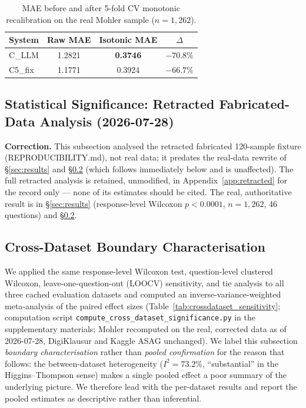 \documentclass[conference]{IEEEtran}
\begin{document}
\begin{table}[t]
\caption{MAE before and after 5-fold CV monotonic recalibration on the
real Mohler sample ($n=1{,}262$).}
\label{tab:calibration}
\centering
\begin{tabular}{lccc}
\toprule
\textbf{System} & \textbf{Raw MAE} & \textbf{Isotonic MAE} & \textbf{$\Delta$} \\
\midrule
C\_LLM  & 1.2821 & \textbf{0.3746} & $-70.8\%$ \\
C5\_fix & 1.1771 & 0.3924 & $-66.7\%$ \\
\bottomrule
\end{tabular}
\end{table}

\subsection{Statistical Significance: Retracted Fabricated-Data Analysis (2026-07-28)}
\label{subsec:significance}

\textbf{Correction.} This subsection analysed the retracted fabricated
120-sample fixture (REPRODUCIBILITY.md), not real data; it predates the
real-data rewrite of \S\ref{sec:results} and
\S\ref{subsec:crossdataset_sig} (which follows immediately below and is
unaffected). The full retracted analysis is retained, unmodified, in
Appendix~\ref{app:retracted} for the record only --- none of its
estimates should be cited. The real, authoritative result is in
\S\ref{sec:results} (response-level Wilcoxon $p<0.0001$, $n=1{,}262$,
46 questions) and \S\ref{subsec:crossdataset_sig}.


\subsection{Cross-Dataset Boundary Characterisation}
\label{subsec:crossdataset_sig}

We applied the same response-level Wilcoxon test, question-level clustered
Wilcoxon, leave-one-question-out (LOOCV) sensitivity, and tie analysis to all
three cached evaluation datasets and computed an inverse-variance-weighted
meta-analysis of the paired effect sizes
(Table~\ref{tab:crossdataset_sensitivity}; computation script
\texttt{compute\_cross\_dataset\_significance.py} in the supplementary
materials; Mohler recomputed on the real, corrected data as of
2026-07-28, DigiKlausur and Kaggle ASAG unchanged). We label this
subsection \emph{boundary characterisation}
rather than \emph{pooled confirmation} for the reason that follows: the
between-dataset heterogeneity ($I^2 = 73.2\%$, ``substantial'' in the
Higgins--Thompson sense) makes a single pooled effect a poor summary of the
underlying picture. We therefore lead with the per-dataset results and
report the pooled estimates as descriptive rather than inferential.
\end{document}

